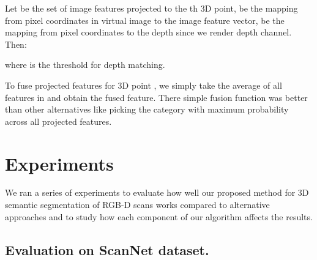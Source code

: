 \documentclass[runningheads]{llncs}
\begin{document}
Let  be the set of image features projected to the th 3D point,  be the mapping from pixel coordinates in virtual image  to the image feature vector,  be the mapping from pixel coordinates to the depth since we render depth channel. Then:

where  is the threshold for depth matching.

To fuse projected features  for 3D point , we simply take the average of all features in  and obtain the fused feature. There simple fusion function was better than other alternatives like picking the category with maximum probability across all projected features.









 \section{Experiments}\label{sec:exp}

We ran a series of experiments to evaluate how well our proposed method for 3D semantic segmentation of RGB-D scans works compared to alternative approaches and to study how each component of our algorithm affects the results.

\subsection{Evaluation on ScanNet dataset.}
\end{document}
